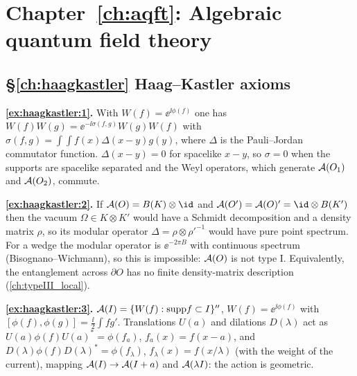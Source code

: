 {\section*{Chapter~\ref{ch:aqft}: Algebraic quantum field theory}

\subsection*{\S\ref{ch:haagkastler} Haag--Kastler axioms}
\textbf{\ref{ex:haagkastler:1}.} With $W(f)=\ee^{\ii\phi(f)}$ one has $W(f)W(g)=\ee^{-\ii\sigma(f,g)}W(g)W(f)$ with $\sigma(f,g)=\int\!\!\int f(x)\Delta(x-y)g(y)$, where $\Delta$ is the Pauli--Jordan commutator function. $\Delta(x-y)=0$ for spacelike $x-y$, so $\sigma=0$ when the supports are spacelike separated and the Weyl operators, which generate $\mathcal{A}(O_1)$ and $\mathcal{A}(O_2)$, commute.\par
\textbf{\ref{ex:haagkastler:2}.} If $\A(O)=B(K)\otimes\id$ and $\A(O')=\A(O)'=\id\otimes B(K')$ then the vacuum $\Omega\in K\otimes K'$ would have a Schmidt decomposition and a density matrix $\rho$, so its modular operator $\Delta=\rho\otimes\rho'^{-1}$ would have pure point spectrum. For a wedge the modular operator is $\ee^{-2\pi B}$ with continuous spectrum (Bisognano--Wichmann), so this is impossible: $\mathcal{A}(O)$ is not type I. Equivalently, the entanglement across $\partial O$ has no finite density-matrix description (\cref{ch:typeIII_local}).\par
\textbf{\ref{ex:haagkastler:3}.} $\mathcal{A}(I)=\{W(f):\mathrm{supp}f\subset I\}''$, $W(f)=\ee^{\ii\phi(f)}$ with $[\phi(f),\phi(g)]=\frac\ii2\int f g'$. Translations $U(a)$ and dilations $D(\lambda)$ act as $U(a)\phi(f)U(a)^*=\phi(f_a)$, $f_a(x)=f(x-a)$, and $D(\lambda)\phi(f)D(\lambda)^*=\phi(f_\lambda)$, $f_\lambda(x)=f(x/\lambda)$ (with the weight of the current), mapping $\mathcal{A}(I)\to\mathcal{A}(I+a)$ and $\mathcal{A}(\lambda I)$: the action is geometric.\par

}
